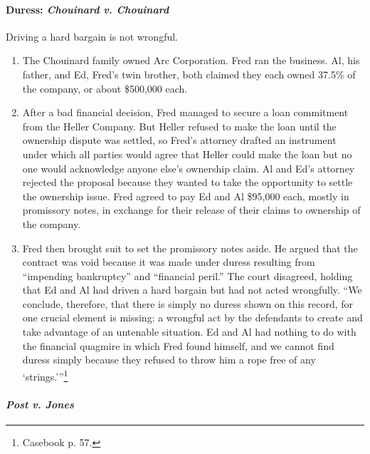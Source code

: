 \paragraph{Duress: \emph{Chouinard v. Chouinard}}

Driving a hard bargain is not wrongful.

\begin{enumerate}
    \item The Chouinard family owned Arc Corporation. Fred ran the business. 
    Al, his father, and Ed, Fred's twin brother, both claimed they each owned 
    37.5\% of the company, or about \$500,000 each.
    \item After a bad financial decision, Fred managed to secure a loan 
    commitment from the Heller Company. But Heller refused to make the loan 
    until the ownership dispute was settled, so Fred's attorney drafted an 
    instrument under which all parties would agree that Heller could make the 
    loan but no one would acknowledge anyone else's ownership claim. Al and 
    Ed's attorney rejected the proposal because they wanted to take the 
    opportunity to settle the ownership issue. Fred agreed to pay Ed and Al 
    \$95,000 each, mostly in promissory notes, in exchange for their release 
    of their claims to ownership of the company.
    \item Fred then brought suit to set the promissory notes aside. He argued 
    that the contract was void because it was made under duress resulting from 
    ``impending bankruptcy'' and ``financial peril.'' The court disagreed, 
    holding that Ed and Al had driven a hard bargain but had not acted 
    wrongfully. \enquote{We conclude, therefore, that there is simply no 
    duress shown on this record, for one crucial element is missing: a 
    wrongful act by the defendants to create and take advantage of an 
    untenable situation. Ed and Al had nothing to do with the financial 
    quagmire in which Fred found himself, and we cannot find duress simply 
    because they refused to throw him a rope free of any 
    \enquote{strings.}}\footnote{Casebook p. 57.}
\end{enumerate}

\paragraph{\emph{Post v. Jones}}


